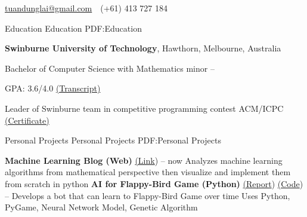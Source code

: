 \documentclass[letterpaper,MMMyyyy,nonstopmode]{simpleresumecv}
\newcommand{\CVAuthor}{Tuan Dung Lai}
\newcommand{\CVWebpage}{dunglai.github.io}
\begin{document}

\Title{\CVAuthor}

\begin{SubTitle}
\par
\href{mailto:tuandunglai@gmail.com}
{tuandunglai@gmail.com}
\,\SubBulletSymbol\,
(+61) 413 727 184
\,
\end{SubTitle}

\begin{Body}


\Section
{Education}
{Education}
{PDF:Education}

\Entry
{\textbf{Swinburne University of Technology}},
Hawthorn, Melbourne, Australia

\Gap
\BulletItem
Bachelor of Computer Science with Mathematics minor
\hfill
{} --

\SubBulletItem GPA: 3.6/4.0 
\href{https://dunglai.github.io/public/post-assets/About/AcademicTranscript.pdf}{(\color{blue}Transcript)}

\SubBulletItem Leader of Swinburne team in competitive programming contest ACM/ICPC \href{https://dunglai.github.io/public/post-assets/About/CVLatex/ACMcert.png}{(\color{blue}Certificate)}



\Section
{Personal Projects}
{Personal Projects}
{PDF:Personal Projects}

\BulletItem
\textbf{Machine Learning Blog (Web)} \href{https://dunglai.github.io}{(\color{blue}Link})
\hfill
{} --
now
\SubBulletItem Analyzes machine learning algorithms from mathematical perspective then visualize and implement them from scratch in python
\Gap\Gap\Gap
\BulletItem
\textbf{AI for Flappy-Bird Game (Python)} \href{https://dunglai.github.io/public/post-assets/FlappyBirdAI/report.pdf}{(\color{blue}Report}) \href{https://github.com/DungLai/AI-FlappyBird}{(\color{blue}Code})
\hfill
{} --
\SubBulletItem Develops a bot that can learn to Flappy-Bird Game over time
\SubBulletItem Uses Python, PyGame, Neural Network Model, Genetic Algorithm


\end{Body}
\end{document}
